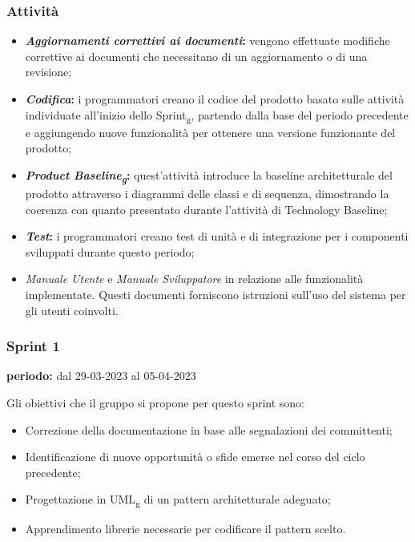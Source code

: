 \subsubsection{Attività}
\begin{itemize}
\item \textbf{\textit{Aggiornamenti correttivi ai documenti}:} vengono effettuate modifiche correttive ai documenti che necessitano di un aggiornamento o di una revisione;
\item \textbf{\textit{Codifica}:} i programmatori creano il codice del prodotto basato sulle attività individuate all'inizio dello Sprint\textsubscript{g}, partendo dalla base del periodo precedente e aggiungendo nuove funzionalità per ottenere una versione funzionante del prodotto;
\item \textbf{\textit{Product Baseline\textsubscript{g}}:} quest'attività introduce la baseline architetturale del prodotto attraverso i diagrammi delle classi e di sequenza, dimostrando la coerenza con quanto presentato durante l'attività di Technology Baseline;  
\item \textbf{\textit{Test}:} i programmatori creano test di unità e di integrazione per i componenti sviluppati durante questo periodo;
\item \textit{Manuale Utente} e \textit{Manuale Sviluppatore} in relazione alle funzionalità implementate. Questi documenti forniscono istruzioni sull'uso del sistema per gli utenti coinvolti.
\end{itemize}

\subsubsection{Sprint 1}
\begin{center}
\textbf{periodo:} dal 29-03-2023 al 05-04-2023\\
\end{center}
Gli obiettivi che il gruppo si propone per questo sprint sono:
\begin{itemize}
\item Correzione della documentazione in base alle segnalazioni dei committenti;
\item Identificazione di nuove opportunità o sfide emerse nel corso del ciclo precedente;
\item Progettazione in UML\textsubscript{g} di un pattern architetturale adeguato;
\item Apprendimento librerie necessarie per codificare il pattern scelto.
\end{itemize}

